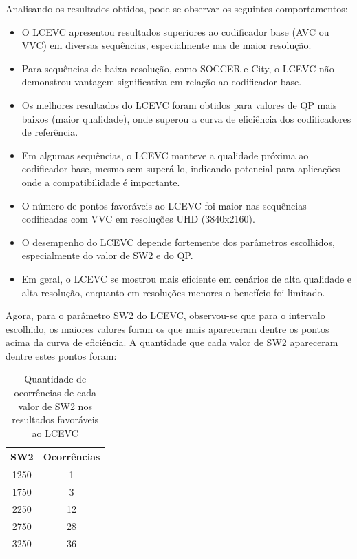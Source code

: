 Analisando os resultados obtidos, pode-se observar os seguintes comportamentos:

\begin{itemize}
    \item O LCEVC apresentou resultados superiores ao codificador base (AVC ou VVC) em diversas sequências, especialmente nas de maior resolução.
    \item Para sequências de baixa resolução, como SOCCER e City, o LCEVC não demonstrou vantagem significativa em relação ao codificador base.
    \item Os melhores resultados do LCEVC foram obtidos para valores de QP mais baixos (maior qualidade), onde superou a curva de eficiência dos codificadores de referência.
    \item Em algumas sequências, o LCEVC manteve a qualidade próxima ao codificador base, mesmo sem superá-lo, indicando potencial para aplicações onde a compatibilidade é importante.
    \item O número de pontos favoráveis ao LCEVC foi maior nas sequências codificadas com VVC em resoluções UHD (3840x2160).
    \item O desempenho do LCEVC depende fortemente dos parâmetros escolhidos, especialmente do valor de SW2 e do QP.
    \item Em geral, o LCEVC se mostrou mais eficiente em cenários de alta qualidade e alta resolução, enquanto em resoluções menores o benefício foi limitado.
\end{itemize}

Agora, para o parâmetro SW2 do \acrshort{LCEVC}, observou-se que para o intervalo escolhido,
os maiores valores foram os que mais apareceram dentre os pontos acima da curva de eficiência.
A quantidade que cada valor de SW2 apareceram dentre estes pontos foram:

\begin{table}[h]
    \centering
    \begin{tabular}{|c|c|}
        \hline
        \textbf{SW2} & \textbf{Ocorrências} \\
        \hline
        1250 & 1 \\
        1750 & 3 \\
        2250 & 12 \\
        2750 & 28 \\
        3250 & 36 \\
        \hline
    \end{tabular}
    \caption{Quantidade de ocorrências de cada valor de SW2 nos resultados favoráveis ao LCEVC}
    \label{tab:sw2-contagem}
\end{table}

